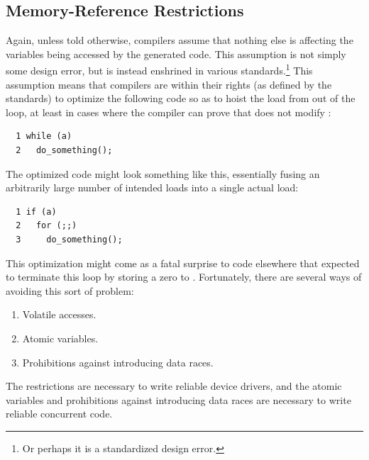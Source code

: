 \subsection{Memory-Reference Restrictions}
\label{sec:memorder:Memory-Reference Restrictions}

Again, unless told otherwise, compilers assume that nothing else
is affecting the variables being accessed by the generated code.
This assumption is not simply some design error, but is instead enshrined in
various standards.\footnote{
	Or perhaps it is a standardized design error.}
This assumption means that compilers are within their rights
(as defined by the standards) to optimize the following code
so as to hoist the load from  out of the loop, at least
in cases where the compiler can prove that 
does not modify :

\vspace{5pt}
\begin{minipage}[t]{\columnwidth}
\scriptsize
\begin{verbatim}
  1 while (a)
  2   do_something();
\end{verbatim}
\end{minipage}
\vspace{5pt}

The optimized code might look something like this, essentially
fusing an arbitrarily large number of intended loads into a single
actual load:

\vspace{5pt}
\begin{minipage}[t]{\columnwidth}
\scriptsize
\begin{verbatim}
  1 if (a)
  2   for (;;)
  3     do_something();
\end{verbatim}
\end{minipage}
\vspace{5pt}

This optimization might come as a fatal surprise to code elsewhere
that expected to terminate this loop by storing a zero to .
Fortunately, there are several ways of avoiding this sort of problem:

\begin{enumerate}
\item	Volatile accesses.
\item	Atomic variables.
\item	Prohibitions against introducing data races.
\end{enumerate}

The  restrictions are necessary to write reliable
device drivers, and the atomic variables and prohibitions against
introducing data races are necessary to write reliable concurrent
code.

